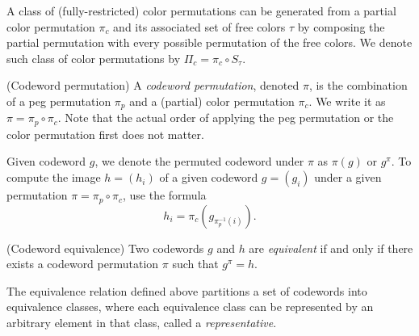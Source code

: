 A class of (fully-restricted) color permutations can be generated from a partial color permutation $\pi_c$ and its associated set of free colors $\tau$ by composing the partial permutation with every possible permutation of the free colors. We denote such class of color permutations by $\Pi_c = \pi_c \circ S_\tau$.


\begin{definition}
(Codeword permutation) A \emph{codeword permutation}, denoted $\pi$, is the combination of a peg permutation $\pi_p$ and a (partial) color permutation $\pi_c$. We write it as $\pi = \pi_p \circ \pi_c$. Note that the actual order of applying the peg permutation or the color permutation first does not matter.
\end{definition}

Given codeword $g$, we denote the permuted codeword under $\pi$ as $\pi(g)$ or $g^\pi$. 
To compute the image $h = (h_i)$ of a given codeword $g = (g_i)$ under a given permutation $\pi = \pi_p \circ \pi_c$, use the formula
\[
h_i = \pi_c\left(g_{\pi_p^{-1}(i)}\right) .
\]

%

\begin{definition}
(Codeword equivalence) Two codewords $g$ and $h$ are \emph{equivalent} if and only if there exists a codeword permutation $\pi$ such that $g^\pi = h$.
\end{definition}

The equivalence relation defined above partitions a set of codewords into equivalence classes, where each equivalence class can be represented by an arbitrary element in that class, called a \emph{representative}. 

